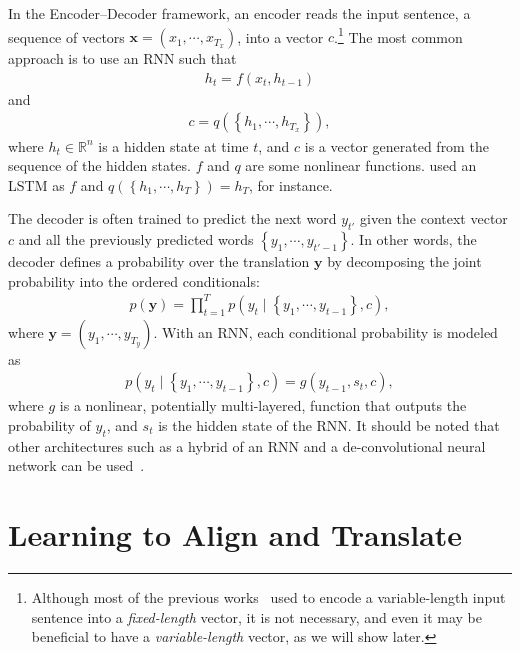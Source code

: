 \documentclass{article}
\newcommand{\vect}[1]{\mathbf{#1}}
\newcommand{\vx}[0]{\vect{x}}
\newcommand{\vy}[0]{\vect{y}}
\newcommand{\RR}[0]{\mathbb{R}}
\begin{document}
In the Encoder--Decoder framework, an encoder reads the input sentence, a
sequence of vectors $\vx=\left( x_1, \cdots, x_{T_x} \right)$, into a vector
$c$.\footnote{
    Although most of the previous works~\citep[see,
    e.g.,][]{Cho2014,Sutskever2014,Kalchbrenner2013} used to encode a
    variable-length input sentence into a {\it fixed-length} vector, it is not
    necessary, and even it may be beneficial to have a {\it variable-length}
    vector, as we will show later.
} The most common approach is to use an RNN such that  
\begin{align}
    \label{eq:forward_state}
    h_t = f\left( x_{t}, h_{t-1} \right)
\end{align}
and
\begin{align*}
    c = q\left(\left\{ h_1, \cdots, h_{T_x} \right\}\right),
\end{align*}
where $h_t \in \RR^{n}$ is a hidden state at time $t$, and $c$ is a vector
generated from the sequence of the hidden states. $f$ and $q$ are some
nonlinear functions. \citet{Sutskever2014} used an LSTM as $f$ and
$q\left(\left\{ h_1, \cdots, h_T \right\}\right)=h_T$, for instance.

The decoder is often trained to predict the next word $y_{t'}$ given the context
vector $c$ and all the previously predicted words $\left\{ y_1, \cdots, y_{t'-1}
\right\}$. In other words, the decoder defines a probability over the
translation $\vy$ by decomposing the joint probability into the ordered
conditionals:
\begin{align}
    \label{eq:decoder_prob}
    p(\vy) = \prod_{t=1}^T p(y_t \mid \left\{ y_1, \cdots, y_{t-1} \right\}, c),
\end{align}
where $\vy = \left( y_1, \cdots, y_{T_y} \right)$. With an RNN, each
conditional probability is modeled as
\begin{align}
    \label{eq:output_rnn}
    p(y_t \mid \left\{ y_1, \cdots, y_{t-1} \right\}, c) = g(y_{t-1}, s_{t}, c),
\end{align}
where $g$ is a nonlinear, potentially multi-layered, function that outputs the
probability of $y_t$, and $s_t$ is the hidden state of the RNN.  It should be
noted that other architectures such as a hybrid of an RNN and a
de-convolutional neural network can be used~\citep{Kalchbrenner2013}.

\section{Learning to Align and Translate}
\label{sec:main}
\end{document}
